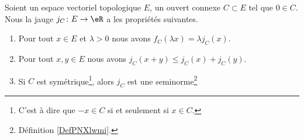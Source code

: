 \begin{proposition}	\label{PROPooEBPPooDWUwLx}
	Soient un espace vectoriel topologique \( E\), un ouvert connexe \( C\subset E\) tel que \( 0\in C\). Nous la jauge \(j_C \colon E\to \eR  \) a les propriétés suivantes.
	\begin{enumerate}
		\item		\label{ITEMooAOUUooGhrpk}
		      Pour tout \( x\in E\) et \( \lambda>0\) nous avons \( f_C(\lambda x)=\lambda j_C(x)\).
		\item		\label{ITEMooQWIQooMRramc}
		      Pour tout \( x,y\in E\) nous avons \( j_C(x+y)\leq j_C(x)+j_C(y)\).
		\item		\label{ITEMooKGNFooKAEUPH}
		      Si \( C\) est symétrique\footnote{C'est à dire que \( -x\in C\) si et seulement si \( x\in C\).}, alors \( j_C\) est une seminorme\footnote{Définition \ref{DefPNXlwmi}.}
	\end{enumerate}
\end{proposition}

